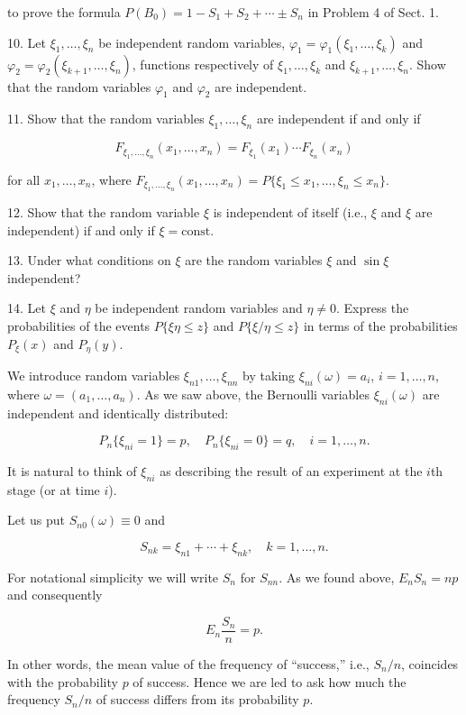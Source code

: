 {{to prove the formula $P(B_0) = 1 - S_1 + S_2 + \cdots \pm S_n$ in Problem 4 of Sect. 1.

10. Let $\xi_1, \ldots, \xi_n$ be independent random variables, $\varphi_1 = \varphi_1(\xi_1, \ldots, \xi_k)$ and $\varphi_2 = \varphi_2(\xi_{k+1}, \ldots, \xi_n)$, functions respectively of $\xi_1, \ldots, \xi_k$ and $\xi_{k+1}, \ldots, \xi_n$. Show that the random variables $\varphi_1$ and $\varphi_2$ are independent.

11. Show that the random variables $\xi_1, \ldots, \xi_n$ are independent if and only if

$$F_{\xi_1, \ldots, \xi_n}(x_1, \ldots, x_n) = F_{\xi_1}(x_1) \cdots F_{\xi_n}(x_n)$$

for all $x_1, \ldots, x_n$, where $F_{\xi_1, \ldots, \xi_n}(x_1, \ldots, x_n) = P\{\xi_1 \leq x_1, \ldots, \xi_n \leq x_n\}.$

12. Show that the random variable $\xi$ is independent of itself (i.e., $\xi$ and $\xi$ are independent) if and only if $\xi = \text{const}.$

13. Under what conditions on $\xi$ are the random variables $\xi$ and $\sin \xi$ independent?

14. Let $\xi$ and $\eta$ be independent random variables and $\eta \neq 0$. Express the probabilities of the events $P\{\xi \eta \leq z\}$ and $P\{\xi/\eta \leq z\}$ in terms of the probabilities $P_{\xi}(x)$ and $P_{\eta}(y).$

We introduce random variables $\xi_{n1}, \ldots, \xi_{nn}$ by taking $\xi_{ni}(\omega) = a_i$, $i = 1, \ldots, n$, where $\omega = (a_1, \ldots, a_n)$. As we saw above, the Bernoulli variables $\xi_{ni}(\omega)$ are independent and identically distributed:

$$P_n \{\xi_{ni} = 1\} = p, \quad P_n \{\xi_{ni} = 0\} = q, \quad i = 1, \ldots, n.$$

It is natural to think of $\xi_{ni}$ as describing the result of an experiment at the $i$th stage (or at time $i$).

Let us put $S_{n0}(\omega) \equiv 0$ and

$$S_{nk} = \xi_{n1} + \cdots + \xi_{nk}, \quad k = 1, \ldots, n.$$

For notational simplicity we will write $S_n$ for $S_{nn}$. As we found above, $E_n S_n = np$ and consequently

$$E_n \frac{S_n}{n} = p.$$

In other words, the mean value of the frequency of “success,” i.e., $S_n/n$, coincides with the probability $p$ of success. Hence we are led to ask how much the frequency $S_n/n$ of success differs from its probability $p$.

}}
